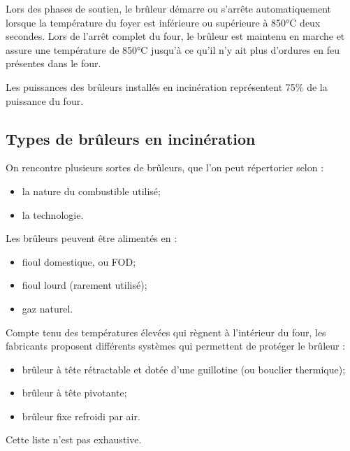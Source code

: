 \vspace{0.3cm}

Lors des phases de soutien, le brûleur démarre ou s’arrête automatiquement lorsque la température du foyer est inférieure ou supérieure à 850°C deux secondes.
Lors de l’arrêt complet du four, le brûleur est maintenu en marche et assure une température de 850°C jusqu’à ce qu’il n’y ait plus d’ordures en feu présentes dans le four.
\vspace{0.3cm}

Les puissances des brûleurs installés en incinération représentent 75\% de la puissance du four.



\subsection{Types de brûleurs en incinération}


On rencontre plusieurs sortes de brûleurs, que l’on peut répertorier selon :
\begin{itemize}
\item  la nature du combustible utilisé;
\item  la technologie.
 

\end{itemize}

Les brûleurs peuvent être alimentés en :
\begin{itemize}
\item  fioul domestique, ou FOD;
\item  fioul lourd (rarement utilisé);
\item  gaz naturel.

\end{itemize}


Compte tenu des températures élevées qui règnent à l’intérieur du four, les fabricants proposent différents systèmes qui permettent de protéger le brûleur :

\begin{itemize}
\item  brûleur à tête rétractable et dotée d’une guillotine (ou bouclier thermique);
\item  brûleur à tête pivotante;
\item  brûleur fixe refroidi par air.

\end{itemize}

Cette liste n'est pas exhaustive.
 
 
 
